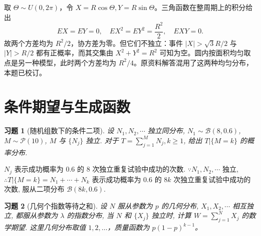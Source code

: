 \documentclass[12pt,fontset=fandol]{ctexart}
\newtheorem{exercise}{习题}[section]
\begin{document}
\begin{solve}\label{a:A5.35}取 $\Theta\sim U(0,2\pi)$，令 $X=R\cos\Theta,Y=R\sin\Theta$。三角函数在整周期上的积分给出\[EX=EY=0,\quad EX^2=EY^2=\frac{R^2}{2},\quad EXY=0.\]故两个方差均为 $R^2/2$，协方差为零。但它们不独立：事件 $|X|>\sqrt3R/2$ 与 $|Y|>R/2$ 都有正概率，而其交集由 $X^2+Y^2=R^2$ 可知为空。圆内按面积均匀取点是另一种模型，此时两个方差均为 $R^2/4$。原资料解答混用了这两种均匀分布，本题已校订。\end{solve}

\clearpage\section{条件期望与生成函数}

\begin{exercise}[随机组数下的条件二项]\label{q:A6.1}
设 $N_1,N_2,\cdots$ 独立同分布, $N_1\sim\mathcal{B}(8,0.6)$, $M\sim\mathcal{P}(10)$, $M$ 与 $\{N_j\}$ 独立. 对于 $T=\sum\limits_{j=1}^MN_j,k\geq1$, 给出 $T|\{M=k\}$ 的概率分布.\par{}
\end{exercise}

\begin{solve}\label{a:A6.1}
    $N_j$ 表示成功概率为 $0.6$ 的 $8$ 次独立重复试验中成功的次数. $\because N_1,N_2,\cdots$ 独立, $\therefore T|\{M=k\}=N_1+\cdots+N_k$ 表示成功概率为 $0.6$ 的 $8k$ 次独立重复试验中成功的次数, 服从二项分布 $\mathcal{B}(8k,0.6)$.
\end{solve}

\begin{exercise}[几何个指数等待之和]\label{q:A6.3}
设 $N$ 服从参数为 $p$ 的几何分布, $X_1,X_2,\cdots$ 相互独立, 都服从参数为 $\lambda$ 的指数分布, 当 $N$ 和 $\{X_j\}$ 独立时, 计算 $W=\sum\limits_{j=1}^NX_j$ 的数学期望. 这里几何分布取值 $1,2,\ldots$，质量函数为 $p(1-p)^{k-1}$。\par{}
\end{exercise}
\end{document}
